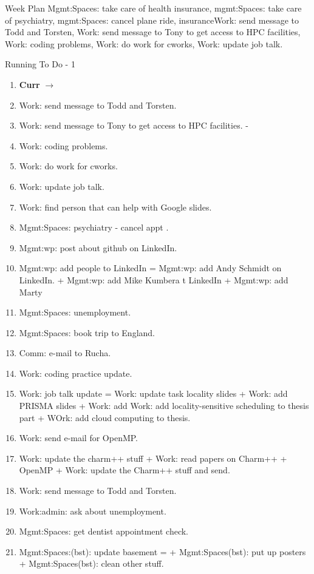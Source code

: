 
\begin{frame}{Week Plan} 
Mgmt:Spaces: take care of health insurance, mgmt:Spaces: take care of psychiatry, mgmt:Spaces: cancel plane ride, insuranceWork: send message to Todd and Torsten, Work: send message to Tony to get access to HPC facilities, Work: coding problems, Work: do work for cworks, Work: update job talk.
\end{frame} 
\begin{frame}{Running To Do - 1}
\begin{enumerate}
  \tiny \item[] \tiny \textbf{Curr} $\rightarrow$

\tiny \item \tiny Work: send message to Todd and Torsten. 
\item \tiny Work: send message to Tony to get access to HPC facilities. - 
\item \tiny Work: coding problems. 
\item \tiny Work: do work for cworks. 
\item \tiny Work: update job talk. 
\item \tiny Work: find person that can help with Google slides.
\item \tiny Mgmt:Spaces: psychiatry - cancel appt . 
\item \tiny Mgmt:wp: post about github on LinkedIn. 
\item \tiny Mgmt:wp: add people to LinkedIn =  Mgmt:wp: add Andy Schmidt on LinkedIn. +  Mgmt:wp: add Mike Kumbera t  LinkedIn + Mgmt:wp: add Marty

\item \tiny Mgmt:Spaces: unemployment. 
\item \tiny Mgmt:Spaces: book trip to England. 
\item \tiny Comm: e-mail to Rucha. 
\item \tiny Work: coding practice update. 
\item \tiny Work: job talk update = Work: update task locality slides
  + Work: add PRISMA slides + Work: add Work: add locality-sensitive 
scheduling to thesis part + WOrk: add cloud computing to thesis. 
\item \tiny Work: send e-mail for OpenMP. 
\item \tiny Work: update the charm++ stuff +  Work: read papers on 
  Charm++ + OpenMP + Work: update the Charm++ stuff and send. 
\item \tiny Work: send message to Todd and Torsten. 
\item \tiny Work:admin: ask about unemployment. 
\item \tiny Mgmt:Spaces: get dentist appointment check. 
\item \tiny Mgmt:Spaces:(bst): update basement =  + Mgmt:Spaces(bst): put up posters + Mgmt:Spaces(bst): clean other stuff. 

    \seti
\end{enumerate}
 
\end{frame}
  
